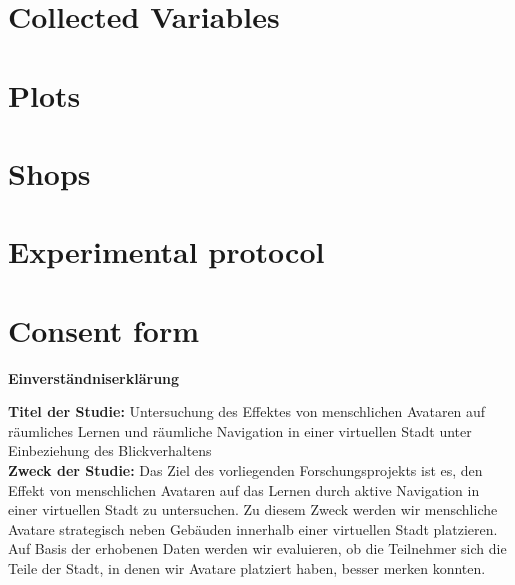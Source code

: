 \chapter{Collected Variables}\label{appdx1}%


\chapter{Plots}\label{appdx2}


\chapter{Shops}\label{appdx3}


\chapter{Experimental protocol}\label{appdx4}


\chapter{Consent form}\label{appdx5}

\begin{center}
	\LARGE{\textbf{Einverständniserklärung}} \\
\end{center}


\textbf{Titel der Studie:} Untersuchung des Effektes von menschlichen Avataren auf räumliches Lernen und räumliche Navigation in einer virtuellen Stadt unter Einbeziehung des Blickverhaltens \\

\textbf{Zweck der Studie:} Das Ziel des vorliegenden Forschungsprojekts ist es, den Effekt von menschlichen Avataren auf das Lernen durch aktive Navigation in einer virtuellen Stadt zu untersuchen. Zu diesem Zweck werden wir menschliche Avatare strategisch neben Gebäuden innerhalb einer virtuellen Stadt platzieren. Auf Basis der erhobenen Daten werden wir evaluieren, ob die Teilnehmer sich die Teile der Stadt, in denen wir Avatare platziert haben, besser merken konnten. \\

